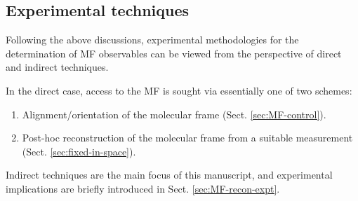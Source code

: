\documentclass[10pt]{article}
\begin{document}






\subsection{Experimental techniques\label{sec:experimentalTechniques}}

Following the above discussions, experimental methodologies for the determination of MF observables can be viewed from the perspective of direct and indirect techniques. 

In the direct case, access to the MF is sought via essentially one of two schemes:

\begin{enumerate}
\item Alignment/orientation of the molecular frame (Sect. \ref{sec:MF-control}).
\item Post-hoc reconstruction of the molecular frame from a suitable measurement (Sect. \ref{sec:fixed-in-space}).
\end{enumerate}

Indirect techniques are the main focus of this manuscript, and experimental implications are briefly introduced in Sect. \ref{sec:MF-recon-expt}.


\end{document}
